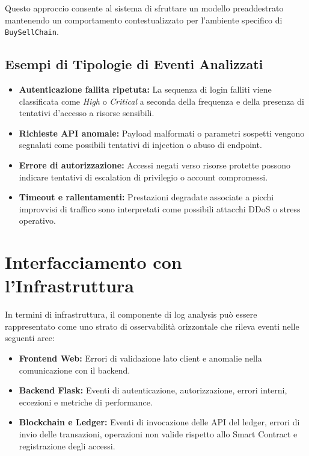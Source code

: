 Questo approccio consente al sistema di sfruttare un modello preaddestrato mantenendo un comportamento contestualizzato per l'ambiente specifico di 
\texttt{BuySellChain}.

\subsection{Esempi di Tipologie di Eventi Analizzati}

\begin{itemize}
    \item \textbf{Autenticazione fallita ripetuta:} La sequenza di login falliti viene classificata come \textit{High} o \textit{Critical} a seconda della frequenza e della presenza di tentativi d'accesso a risorse sensibili.
    \item \textbf{Richieste API anomale:} Payload malformati o parametri sospetti vengono segnalati come possibili tentativi di injection o abuso di endpoint.
    \item \textbf{Errore di autorizzazione:} Accessi negati verso risorse protette possono indicare tentativi di escalation di privilegio o account compromessi.
    \item \textbf{Timeout e rallentamenti:} Prestazioni degradate associate a picchi improvvisi di traffico sono interpretati come possibili attacchi DDoS o stress operativo.
\end{itemize}

\section{Interfacciamento con l'Infrastruttura}

In termini di infrastruttura, il componente di log analysis può essere rappresentato come uno strato di osservabilità orizzontale che rileva eventi nelle seguenti aree:

\begin{itemize}
    \item \textbf{Frontend Web:} Errori di validazione lato client e anomalie nella comunicazione con il backend.
    \item \textbf{Backend Flask:} Eventi di autenticazione, autorizzazione, errori interni, eccezioni e metriche di performance.
    \item \textbf{Blockchain e Ledger:} Eventi di invocazione delle API del ledger, errori di invio delle transazioni, operazioni non valide rispetto allo Smart Contract e registrazione degli accessi.
\end{itemize}

